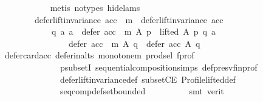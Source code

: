 \begin{isabellebody}
\ \ \ \ \ \ \ \ \ \ \isamarkupfalse%
\ {\isacharparenleft}{\kern0pt}metis\ {\isacharparenleft}{\kern0pt}no{\isacharunderscore}{\kern0pt}types{\isacharcomma}{\kern0pt}\ hide{\isacharunderscore}{\kern0pt}lams{\isacharparenright}{\kern0pt}{\isacharparenright}{\kern0pt}\isanewline
\ \ \ \ \ \ \isamarkupfalse%
\isanewline
\ \ \ \ \ \ \isamarkupfalse%
\isanewline
\ \ \ \ \ \ \ \ {\isachardoublequoteopen}defer{\isacharunderscore}{\kern0pt}lift{\isacharunderscore}{\kern0pt}invariance\ {\isacharparenleft}{\kern0pt}acc\ {\isasymtriangleright}\ m{\isacharparenright}{\kern0pt}\ {\isasymand}\ defer{\isacharunderscore}{\kern0pt}lift{\isacharunderscore}{\kern0pt}invariance\ {\isacharparenleft}{\kern0pt}acc{\isacharparenright}{\kern0pt}\ {\isasymlongrightarrow}\isanewline
\ \ \ \ \ \ \ \ \ \ \ \ {\isacharparenleft}{\kern0pt}{\isasymforall}q\ a{\isachardot}{\kern0pt}\ {\isacharparenleft}{\kern0pt}a\ {\isasymin}\ {\isacharparenleft}{\kern0pt}defer\ {\isacharparenleft}{\kern0pt}acc\ {\isasymtriangleright}\ m{\isacharparenright}{\kern0pt}\ A\ p{\isacharparenright}{\kern0pt}\ {\isasymand}\ lifted\ A\ p\ q\ a{\isacharparenright}{\kern0pt}\ {\isasymlongrightarrow}\isanewline
\ \ \ \ \ \ \ \ \ \ \ \ \ \ \ \ defer\ {\isacharparenleft}{\kern0pt}acc\ {\isasymtriangleright}\ m{\isacharparenright}{\kern0pt}\ A\ q\ {\isasymsubset}\ defer\ acc\ A\ q{\isacharparenright}{\kern0pt}{\isachardoublequoteclose}\isanewline
\ \ \ \ \ \ \ \ \isamarkupfalse%
\ defer{\isacharunderscore}{\kern0pt}card{\isacharunderscore}{\kern0pt}acc\ defer{\isacharunderscore}{\kern0pt}in{\isacharunderscore}{\kern0pt}alts\ monotone{\isacharunderscore}{\kern0pt}m\ prod{\isachardot}{\kern0pt}sel{\isacharparenleft}{\kern0pt}{}{\isacharparenright}{\kern0pt}\ f{\isacharunderscore}{\kern0pt}prof\isanewline
\ \ \ \ \ \ \ \ \ \ \ \ \ \ psubsetI\ sequential{\isacharunderscore}{\kern0pt}composition{\isachardot}{\kern0pt}simps\ def{\isacharunderscore}{\kern0pt}presv{\isacharunderscore}{\kern0pt}fin{\isacharunderscore}{\kern0pt}prof\isanewline
\ \ \ \ \ \ \ \ \ \ \ \ \ \ defer{\isacharunderscore}{\kern0pt}lift{\isacharunderscore}{\kern0pt}invariance{\isacharunderscore}{\kern0pt}def\ subsetCE\ Profile{\isachardot}{\kern0pt}lifted{\isacharunderscore}{\kern0pt}def\isanewline
\ \ \ \ \ \ \ \ \ \ \ \ \ \ seq{\isacharunderscore}{\kern0pt}comp{\isacharunderscore}{\kern0pt}def{\isacharunderscore}{\kern0pt}set{\isacharunderscore}{\kern0pt}bounded\isanewline
\ \ \ \ \ \ \ \ \isamarkupfalse%
\ {\isacharparenleft}{\kern0pt}smt\ {\isacharparenleft}{\kern0pt}verit{\isacharparenright}{\kern0pt}{\isacharparenright}{\kern0pt}\isanewline

\end{isabellebody}
